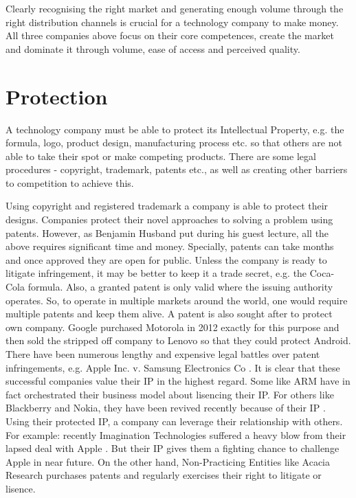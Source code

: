 \documentclass[twocolumn]{bmcart}%
\begin{document}
\par Clearly recognising the right market and generating enough volume through the right distribution channels is crucial for a technology company to make money. All three companies above focus on their core competences, create the market and dominate it through volume, ease of access and perceived quality.

\section*{Protection}

A technology company must be able to protect its Intellectual Property, e.g. the formula, logo, product design, manufacturing process etc. so that others are not able to take their spot or make competing products. There are some legal procedures - copyright, trademark, patents etc., as well as creating other barriers to competition to achieve this.\\

\par Using copyright and registered trademark a company is able to protect their designs. Companies protect their novel approaches to solving a problem using patents. However, as Benjamin Husband put during his guest lecture, all the above requires significant time and money. Specially, patents can take months and once approved they are open for public. Unless the company is ready to litigate infringement, it may be better to keep it a trade secret, e.g. the Coca-Cola formula. Also, a granted patent is only valid where the issuing authority operates. So, to operate in multiple markets around the world, one would require multiple patents and keep them alive. A patent is also sought after to protect own company. Google purchased Motorola in 2012 exactly for this purpose and then sold the stripped off company to Lenovo \cite{waltersbradshawhammond2014} so that they could protect Android. There have been numerous lengthy and expensive legal battles over patent infringements, e.g. Apple Inc. v. Samsung Electronics Co \cite{bradshaw2015}. It is clear that these successful companies value their IP in the highest regard. Some like ARM have in fact orchestrated their business model about lisencing their IP. For others like Blackberry and Nokia, they have been revived recently because of their IP \cite{thomas2014}. Using their protected IP, a company can leverage their relationship with others. For example: recently Imagination Technologies suffered a heavy blow from their lapsed deal with Apple \cite{vincent2017}. But their IP gives them a fighting chance to challenge Apple in near future. On the other hand, Non-Practicing Entities like Acacia Research purchases patents and regularly exercises their right to litigate or lisence.\\
\end{document}
